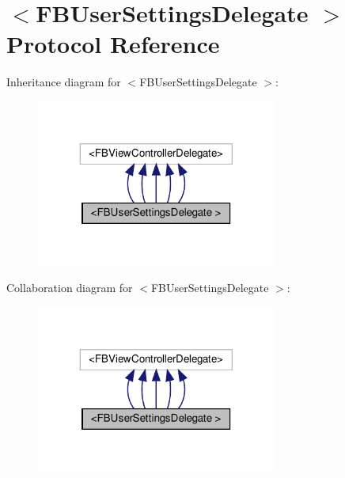 \hypertarget{protocolFBUserSettingsDelegate_01-p}{}\section{$<$F\+B\+User\+Settings\+Delegate $>$ Protocol Reference}
\label{protocolFBUserSettingsDelegate_01-p}


Inheritance diagram for $<$F\+B\+User\+Settings\+Delegate $>$\+:
\nopagebreak
\begin{figure}[H]
\begin{center}
\leavevmode
\includegraphics[width=224pt]{protocolFBUserSettingsDelegate_01-p__inherit__graph}
\end{center}
\end{figure}


Collaboration diagram for $<$F\+B\+User\+Settings\+Delegate $>$\+:
\nopagebreak
\begin{figure}[H]
\begin{center}
\leavevmode
\includegraphics[width=224pt]{protocolFBUserSettingsDelegate_01-p__coll__graph}
\end{center}
\end{figure}

